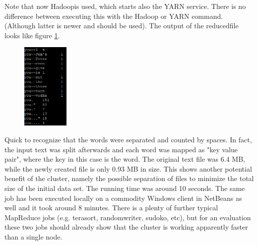 \documentclass[12pt]{article}
\begin{document}
Note that now \glqq Hadoop\grqq is used, which starts also the YARN service. There is no difference between executing this with the Hadoop or YARN command. (Although latter is newer and should be used). The output of the \glqq reduced\grqq file looks like figure \ref{pic:words}.
\begin{figure}[H]
\hspace{5.2cm}
\includegraphics[width=0.2\textwidth]{img/words}
\label{pic:words}
\end{figure}
\noindent Quick to recognize that the words were separated and counted by spaces. In fact, the input text was split
afterwards and each word was mapped as "key value pair", where the key in this case is the word. The
original text file was 6.4 MB, while the newly created file is only 0.93 MB in size. This shows another
potential benefit of the cluster, namely the possible separation of files to minimize the total size of the initial data set. The running time was around 10 seconds. The same job has been executed locally on a
commodity Windows client in NetBeans as well and it took around 8 minutes. There is a plenty of further typical MapReduce jobs (e.g. terasort, randomwriter, sudoko, etc), but for an evaluation these two jobs should already show that the cluster is working apparently faster than a single node.
\end{document}
